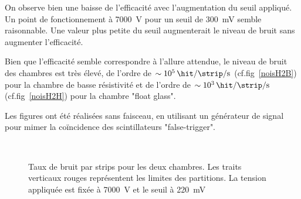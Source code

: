 On observe bien une baisse de l'efficacité avec l'augmentation du seuil appliqué. Un point de fonctionnement à \SI{7000}{\volt} pour un seuil de \SI{300}{\milli\volt} semble raisonnable. Une valeur plus petite du seuil augmenterait le niveau de bruit sans augmenter l'efficacité.

Bien que l'efficacité semble correspondre à l'allure attendue, le niveau de bruit des chambres est très élevé, de l'ordre de $\sim\SI{e5}{\hit\per\strip\per\second}$ (cf.fig~\ref{noisH2B}) pour la chambre de basse résistivité et de l'ordre de $\sim\SI{e3}{\hit\per\strip\per\second}$ (cf.fig~\ref{noisH2H}) pour la chambre "float glass". 

Les figures ont été réalisées sans faisceau, en utilisant un générateur de signal pour mimer la coïncidence des scintillateurs "false-trigger".
\vspace*{0.4cm}
\begin{figure}[ht!]
	\centering
	\\
	\vspace*{1.3cm}
	\caption{Taux de bruit par strips pour les deux chambres. Les traits verticaux rouges représentent les limites des partitions. La tension appliquée est fixée à \SI{7000}{\volt} et le seuil à \SI{220}{\milli\volt}}
\end{figure}


